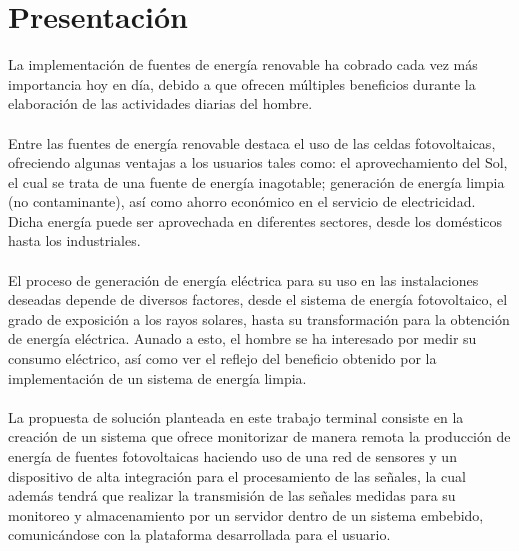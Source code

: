 
\section{Presentación} %
La implementación de fuentes de energía renovable ha cobrado cada vez más importancia hoy en día, debido a que ofrecen múltiples beneficios durante la elaboración de las actividades diarias del hombre. 
\paragraph{}
Entre las fuentes de energía renovable destaca el uso de las celdas fotovoltaicas, ofreciendo algunas ventajas a los usuarios tales como: el aprovechamiento del Sol, el cual se trata de una fuente de energía inagotable; generación de energía limpia (no contaminante), así como ahorro económico en el servicio de electricidad. Dicha energía puede ser aprovechada en diferentes sectores, desde los domésticos hasta los industriales. 
\paragraph{}
El proceso de generación de energía eléctrica para su uso en las instalaciones deseadas depende de diversos factores, desde el sistema de energía fotovoltaico, el grado de exposición a los rayos solares, hasta su transformación para la obtención de energía eléctrica. Aunado a esto, el hombre se ha interesado por medir su consumo eléctrico, así como ver el reflejo del beneficio obtenido por la implementación de un sistema de energía limpia.
\paragraph{}
La propuesta de solución planteada en este trabajo terminal consiste en la creación de un sistema que ofrece monitorizar de manera remota la producción de energía de fuentes fotovoltaicas haciendo uso de una red de sensores y un dispositivo de alta integración para el procesamiento de las señales, la cual además tendrá que realizar la transmisión de las señales medidas para su monitoreo y almacenamiento por un servidor dentro de un sistema embebido, comunicándose con la plataforma desarrollada para el usuario.